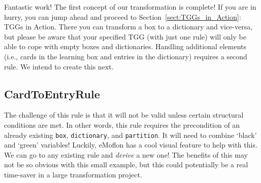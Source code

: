 Fantastic work! The first concept of our transformation is complete! If you are in hurry, you can jump ahead and proceed to Section~\ref{sect:TGGs_in_Action}:
TGGs in Action. There you can transform a box to a dictionary and vice-versa, but please be aware that your specified TGG (with just one rule) will only be
able to cope with empty boxes and dictionaries. Handling additional elements (i.e., cards in the learning box and entries in the dictionary) requires a second rule. We
intend to create this next.

\subsection{CardToEntryRule}

The challenge of this rule is that it will not be valid unless certain structural conditions are met. In other words, this rule requires the
precondition of an already existing \texttt{box}, \texttt{dictionary}, and \texttt{partition}. It will need to combine `black' and `green' variables! Luckily,
eMoflon has a cool visual feature to help with this. We can go to any existing rule and \emph{derive} a new one! The benefits of this may not be so obvious with
this small example, but this could potentially be a real time-saver in a large transformation project.

